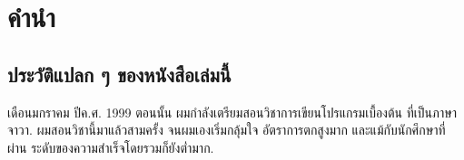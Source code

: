 \fi


\chapter{คำนำ}

\section*{ประวัติแปลก ๆ ของหนังสือเล่มนี้}

%
%


เดือนมกราคม ปีค.ศ. 1999 ตอนนั้น
ผมกำลังเตรียมสอนวิชาการเขียนโปรแกรมเบื้องต้น
ที่เป็นภาษาจาวา.
ผมสอนวิชานี้มาแล้วสามครั้ง
จนผมเองเริ่มกลุ้มใจ
อัตราการตกสูงมาก
และแม้กับนักศึกษาที่ผ่าน ระดับของความสำเร็จโดยรวมก็ยังต่ำมาก.


